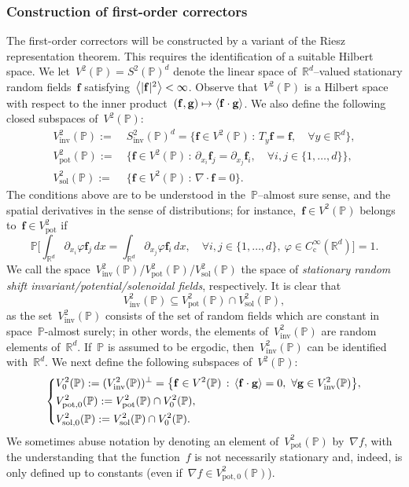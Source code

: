 \documentclass[11pt,twoside]{article} %
\numberwithin{equation}{section}
\theoremstyle{definition}
\let\originalleft\left
\let\originalright\right
\renewcommand{\left}{\mathopen{}\mathclose\bgroup\originalleft}
\renewcommand{\right}{\aftergroup\egroup\originalright}
\newcommand*{\Rd}{\ensuremath{\mathbb{R}^d}}
\newcommand{\g}{\mathbf{g}}
\newcommand{\f}{\mathbf{f}}
\newcommand{\pot}{\mathrm{pot}}
\newcommand{\sol}{\mathrm{sol}}
\newcommand{\inv}{\mathrm{inv}}
\renewcommand{\P}{\mathbb{P}}
\begin{document}
\subsubsection{Construction of first-order correctors}

The first-order correctors will be constructed by a variant of the Riesz representation theorem. This requires the identification of a suitable Hilbert space. We let~$V^2(\P) = S^2(\P)^d$ denote the linear space of~$\Rd$--valued stationary random fields~$\f$ satisfying~$\left\langle |\f|^2 \right\rangle < \infty$. Observe that~$V^2(\P)$ is a Hilbert space with respect to the inner product~$(\f,\g) \mapsto \left\langle \f\cdot \g \right\rangle$. We also define the following closed subspaces of~$V^2(\P)$:
\begin{align*}
V^2_{\mathrm{inv}}(\P) := & \ S^2_{\mathrm{inv}}(\P)^d = 
\big\{
\f \in V^2(\P)\,:\, T_y \f = \f, \quad \forall y\in\Rd 
\big\}, 
\\ 
V^2_\pot(\P) 
:= & \
\big\{
\f \in V^2(\P)\,:\, \partial_{x_i} \f_j = \partial_{x_j} \f_i, \quad \forall i,j\in\{1,\ldots,d\}
\big\}, 
\\ 
V^2_\sol(\P) := &  \
\big\{
\f \in V^2(\P)\,:\, \nabla \cdot \f = 0
\big\}.
\end{align*}
The conditions above are to be understood in the~$\P$--almost sure sense, and the spatial derivatives in the sense of distributions; for instance,~$\f \in V^2(\P)$ belongs to~$\f \in V^2_{\mathrm{pot}}$ if 
\begin{equation*}
\P \biggl[
\int_{\Rd} \partial_{x_i} \varphi \f_j \,dx
=
\int_{\Rd} \partial_{x_j} \varphi  \f_i \,dx, \quad
\forall i,j\in \{1,\ldots,d\},\  \varphi \in C^\infty_{\mathrm{c}}(\Rd)
\biggr] = 1. 
\end{equation*}
We call the space~$V^2_{\inv}(\P)$/$V^2_{\pot}(\P)$/$V^2_{\sol}(\P)$ the space of \emph{stationary random shift invariant/potential/solenoidal fields}, respectively. It is clear that 
\begin{equation*}
V^2_{\inv} (\P) \subseteq V^2_\pot(\P) \cap V^2_\sol(\P),
\end{equation*}
as the set~$V^2_{\inv}(\P)$ consists of the set of random fields which are constant in space~$\P$-almost surely; in other words, the elements of~$V^2_{\mathrm{inv}}(\P)$ are random elements of~$\Rd$. If~$\P$ is assumed to be ergodic, then~$V^2_{\inv}(\P)$ can be identified with~$\Rd$.
We next define the following subspaces of~$V^2(\P)$:
\begin{equation*}
\left\{
\begin{aligned}
& V^2_0(\P) := 
(V^2_{\inv}(\P))^\perp 
= 
\big\{
\f \in V^2(\P) \,:\, 
\langle \f\cdot \g \rangle = 0, \ \forall \g\in V^2_{\inv}(\P)
\big\}, 
\\
& V^2_{\pot,0}(\P)
:= 
V^2_{\pot}(\P)
\cap V^2_0(\P),
\\  &
V^2_{\sol,0}(\P)  
:= 
V^2_{\sol}(\P)
\cap V^2_0(\P).
\end{aligned}
\right.
\end{equation*}
We sometimes abuse notation by denoting an element of~$V^2_\pot(\P)$ by~$\nabla f$, with the understanding that the function~$f$ is not necessarily stationary and, indeed, is only defined up to constants (even if~$\nabla f \in V^2_{\pot,0}(\P)$). 
\end{document}
